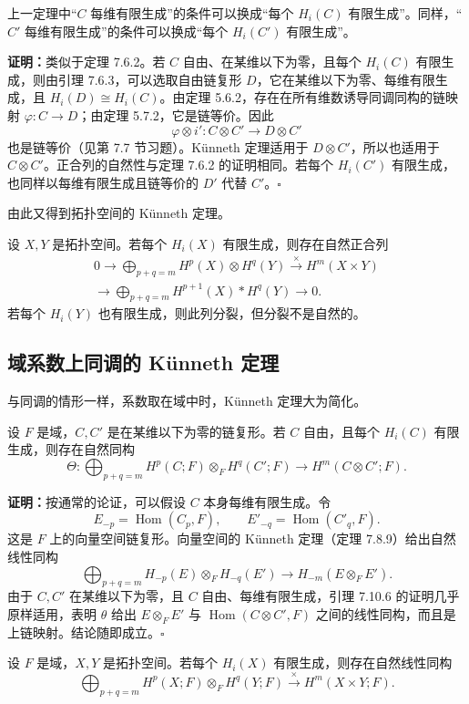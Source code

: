 上一定理中“$C$ 每维有限生成”的条件可以换成“每个 $H_i(C)$ 有限生成”。同样，“$C'$ 每维有限生成”的条件可以换成“每个 $H_i(C')$ 有限生成”。

\textbf{证明：}类似于定理 7.6.2。若 $C$ 自由、在某维以下为零，且每个 $H_i(C)$ 有限生成，则由引理 7.6.3，可以选取自由链复形 $D$，它在某维以下为零、每维有限生成，且 $H_i(D)\cong H_i(C)$。由定理 5.6.2，存在在所有维数诱导同调同构的链映射 $\varphi:C\to D$；由定理 5.7.2，它是链等价。因此
\[
\varphi\otimes i':C\otimes C'\to D\otimes C'
\]
也是链等价（见第 7.7 节习题）。Künneth 定理适用于 $D\otimes C'$，所以也适用于 $C\otimes C'$。正合列的自然性与定理 7.6.2 的证明相同。若每个 $H_i(C')$ 有限生成，也同样以每维有限生成且链等价的 $D'$ 代替 $C'$。\hfill$\square$

由此又得到拓扑空间的 Künneth 定理。

设 $X,Y$ 是拓扑空间。若每个 $H_i(X)$ 有限生成，则存在自然正合列
\[
\begin{split}
0\to\bigoplus_{p+q=m}H^p(X)\otimes H^q(Y)\xrightarrow{\times}H^m(X\times Y)\\
\to\bigoplus_{p+q=m}H^{p+1}(X)*H^q(Y)\to0.
\end{split}
\]
若每个 $H_i(Y)$ 也有限生成，则此列分裂，但分裂不是自然的。

\subsection*{域系数上同调的 Künneth 定理}
与同调的情形一样，系数取在域中时，Künneth 定理大为简化。

设 $F$ 是域，$C,C'$ 是在某维以下为零的链复形。若 $C$ 自由，且每个 $H_i(C)$ 有限生成，则存在自然同构
\[
\Theta:\bigoplus_{p+q=m}H^p(C;F)\otimes_F H^q(C';F)
\longrightarrow H^m(C\otimes C';F).
\]

\textbf{证明：}按通常的论证，可以假设 $C$ 本身每维有限生成。令
\[
E_{-p}=\operatorname{Hom}(C_p,F),\qquad E'_{-q}=\operatorname{Hom}(C'_q,F).
\]
这是 $F$ 上的向量空间链复形。向量空间的 Künneth 定理（定理 7.8.9）给出自然线性同构
\[
\bigoplus_{p+q=m}H_{-p}(E)\otimes_F H_{-q}(E')\longrightarrow H_{-m}(E\otimes_F E').
\]
由于 $C,C'$ 在某维以下为零，且 $C$ 自由、每维有限生成，引理 7.10.6 的证明几乎原样适用，表明 $\theta$ 给出 $E\otimes_F E'$ 与 $\operatorname{Hom}(C\otimes C',F)$ 之间的线性同构，而且是上链映射。结论随即成立。\hfill$\square$

设 $F$ 是域，$X,Y$ 是拓扑空间。若每个 $H_i(X)$ 有限生成，则存在自然线性同构
\[
\bigoplus_{p+q=m}H^p(X;F)\otimes_F H^q(Y;F)\xrightarrow{\times}H^m(X\times Y;F).
\]

